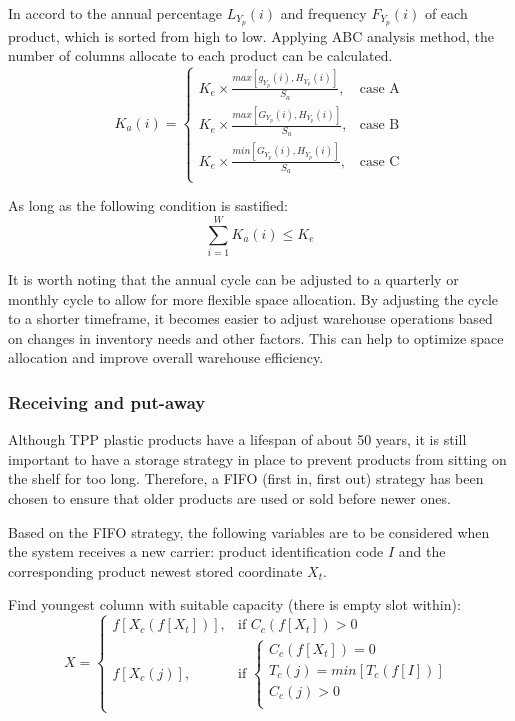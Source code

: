    In accord to the annual percentage ${ L_{Y_p}(i) }$ and frequency ${ F_{Y_p}(i) }$ of each product, which is sorted from high to low. Applying ABC analysis method, the number of columns allocate to each product can be calculated.
    \begin{equation}\label{eq:Ka}
        K_a(i) = 
        \begin{cases}
            K_e \times \frac{max[g_{Y_p}(i),H_{Y_p}(i)]}{S_a}, & 
            \text{case A} \\
            K_e \times \frac{max[G_{Y_p}(i),H_{Y_p}(i)]}{S_a}, & 
            \text{case B} \\
            K_e \times \frac{min[G_{Y_p}(i),H_{Y_p}(i)]}{S_a}, & 
            \text{case C} \\
        \end{cases}
    \end{equation}
    
    As long as the following condition is sastified:
    \begin{equation}\label{eq:ConditionKa}
        \sum_{i=1}^{W} K_a(i) \leq K_e
    \end{equation}

It is worth noting that the annual cycle can be adjusted to a quarterly or monthly cycle to allow for more flexible space allocation. By adjusting the cycle to a shorter timeframe, it becomes easier to adjust warehouse operations based on changes in inventory needs and other factors. This can help to optimize space allocation and improve overall warehouse efficiency.

\subsubsection{Receiving and put-away}

Although TPP plastic products have a lifespan of about 50 years, it is still important to have a storage strategy in place to prevent products from sitting on the shelf for too long. Therefore, a FIFO (first in, first out) strategy has been chosen to ensure that older products are used or sold before newer ones.

Based on the FIFO strategy, the following variables are to be considered when the system receives a new carrier: product identification code ${ I }$ and the corresponding product newest stored coordinate ${ X_t }$.

    Find youngest column with suitable capacity (there is empty slot within):
    \begin{equation}\label{eq:rap find X}
        X = 
        \begin{cases}
            f[X_c(f[X_t])], & \text{if } C_c(f[X_t]) > 0 \\
            f[X_c(j)], & \text{if }
            \begin{cases}
                C_c(f[X_t]) = 0 \\
                T_c(j) = min[T_c(f[I])] \\
                C_c(j) > 0 \\
            \end{cases}
        \end{cases}
    \end{equation}

